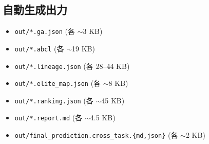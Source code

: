 \documentclass[a4paper,11pt]{article}
\begin{document}
\subsection*{自動生成出力}
\begin{itemize}
  \item \texttt{out/*.ga.json} (各 \(\sim\)3 KB)
  \item \texttt{out/*.abcl} (各 \(\sim\)19 KB)
  \item \texttt{out/*.lineage.json} (各 28--44 KB)
  \item \texttt{out/*.elite\_map.json} (各 \(\sim\)8 KB)
  \item \texttt{out/*.ranking.json} (各 \(\sim\)45 KB)
  \item \texttt{out/*.report.md} (各 \(\sim\)4.5 KB)
  \item \texttt{out/final\_prediction.cross\_task.\{md,json\}} (各 \(\sim\)2 KB)
\end{itemize}
\end{document}
